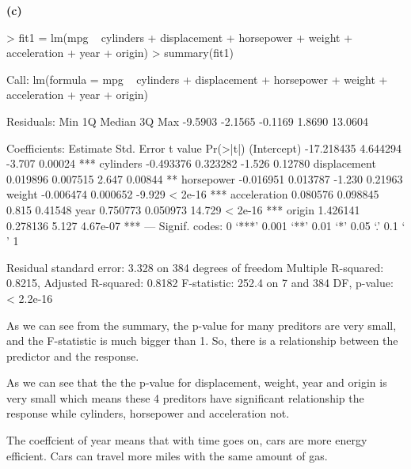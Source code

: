 \documentclass[a4paper]{article}
\renewcommand{\part}[1] {\vspace{.10in} {\bf (#1)}}
\begin{document}
\part{c}
\begin{Schunk}
\begin{Sinput}
> fit1 = lm(mpg ~ cylinders + displacement + horsepower + weight + acceleration + year + origin)
> summary(fit1)
\end{Sinput}
\begin{Soutput}
Call:
lm(formula = mpg ~ cylinders + displacement + horsepower + weight + 
    acceleration + year + origin)

Residuals:
    Min      1Q  Median      3Q     Max 
-9.5903 -2.1565 -0.1169  1.8690 13.0604 

Coefficients:
               Estimate Std. Error t value Pr(>|t|)    
(Intercept)  -17.218435   4.644294  -3.707  0.00024 ***
cylinders     -0.493376   0.323282  -1.526  0.12780    
displacement   0.019896   0.007515   2.647  0.00844 ** 
horsepower    -0.016951   0.013787  -1.230  0.21963    
weight        -0.006474   0.000652  -9.929  < 2e-16 ***
acceleration   0.080576   0.098845   0.815  0.41548    
year           0.750773   0.050973  14.729  < 2e-16 ***
origin         1.426141   0.278136   5.127 4.67e-07 ***
---
Signif. codes:  0 ‘***’ 0.001 ‘**’ 0.01 ‘*’ 0.05 ‘.’ 0.1 ‘ ’ 1

Residual standard error: 3.328 on 384 degrees of freedom
Multiple R-squared:  0.8215,	Adjusted R-squared:  0.8182 
F-statistic: 252.4 on 7 and 384 DF,  p-value: < 2.2e-16
\end{Soutput}
\end{Schunk}
\begin{enumerate}
{\color{red}
\item As we can see from the summary, the p-value for many preditors are very small, and the F-statistic is much bigger than 1. So, there is a relationship between the predictor and the response.

\item As we can see that the the p-value for displacement, weight, year and origin is very small which means these 4 preditors have significant relationship the response while cylinders, horsepower and acceleration not.

\item The coeffcient of year means that with time goes on, cars are more energy efficient. Cars can travel more miles with the same amount of gas.
}
\end{enumerate}
\end{document}
